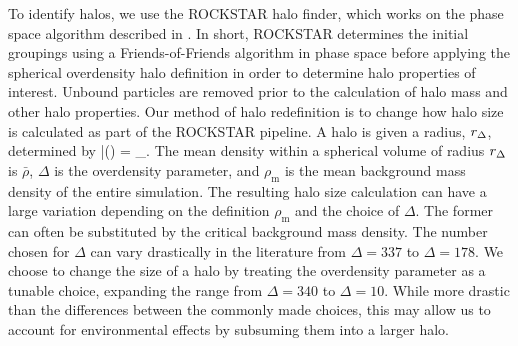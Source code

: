 \documentclass[usenatbib,usegraphicx,letterpaper]{mn2e}
\begin{document}
To identify halos, we use the ROCKSTAR halo finder, which works on the phase space algorithm described in \citet*{behroozi13}. In short, ROCKSTAR determines the initial groupings using a Friends-of-Friends algorithm in phase space before applying the spherical overdensity halo definition in order to determine halo properties of interest. Unbound particles are removed prior to the calculation of halo mass and other halo properties. Our method of halo redefinition is to change how halo size is calculated as part of the ROCKSTAR pipeline. A halo is given a radius, $r_{\Delta}$, determined by
\beq
	\bar{\rho}(\Rdel) = \Delta \rho_{}.
\eeq
The mean density within a spherical volume of radius $r_{\Delta}$ is $\bar{\rho}$, $\Delta$ is the overdensity parameter, and $\rho_{\mathrm{m}}$ is the mean background mass density of the entire simulation. The resulting halo size calculation can have a large variation depending on the definition $\rho_{\mathrm{m}}$ and the choice of $\Delta$. The former can often be substituted by the critical background mass density. The number chosen for $\Delta$ can vary drastically in the literature from $\Delta = 337$ to $\Delta = 178$. We choose to change the size of a halo by treating the overdensity parameter as a tunable choice, expanding the range from $\Delta = 340$ to $\Delta = 10$. While more drastic than the differences between the commonly made choices, this may allow us to account for environmental effects by subsuming them into a larger halo.
\end{document}
